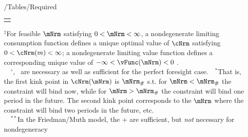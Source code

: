 \documentclass[\econtexRoot/BufferStockTheory]{subfiles}
\providecommand{\TblName}{}
\renewcommand{\TblName}{Required}
\begin{document}
\begin{verbatimwrite}{\econtexRoot/Tables/\TblName}
\begin{table}
{\begin{tabular}{|l|l|l|}
        \\ \hline \multicolumn{3}{c}{}
      \end{tabular}
    } %

    \settowidth\TableWidth{\usebox{\TblBox}}
    \savebox{\TblShrunkBox}{
      \settowidth{\TblShrunk}{\usebox{\TblBox}}
      \resizebox{\textwidth}{!}{\begin{minipage}{\TblShrunk}
          \usebox{\TblBox}
        \end{minipage}}
    }

    \usebox{\TblShrunkBox}


    \parbox{\textwidth}{\raggedright \footnotesize         $^{\ddagger}$For feasible $\mNrm$ satisfying $0 < \mNrm < \infty$, a nondegenerate limiting consumption function defines a unique optimal value of $\cNrm$ satisfying $0 < \cNrm(m) < \infty$; a nondegenerate limiting value function defines a corresponding unique value of $-\infty < \vFunc(\mNrm) < 0$ .\\
      ~~$^{\circ}${\RIC}, \FHWC~are necessary as well as sufficient for the perfect foresight case.~~$^{\ast}$That is, the first kink point in $\cNrm(\mNrm)$ is $\mNrm_{\#}$ s.t.
for $\mNrm < \mNrm_{\#}$ the constraint will bind now, while for $\mNrm > \mNrm_{\#}$ the constraint will bind one period in the future.
The second kink point corresponds to the $\mNrm$ where the constraint will bind two periods in the future, etc.\\
      ~~$^{\ast\ast}$In the Friedman/Muth model, the {\RIC}+{\FHWC} are sufficient, but \textit{not} necessary for nondegeneracy} 
  \end{table}
  
\end{verbatimwrite}
\clearpage

\end{document}
